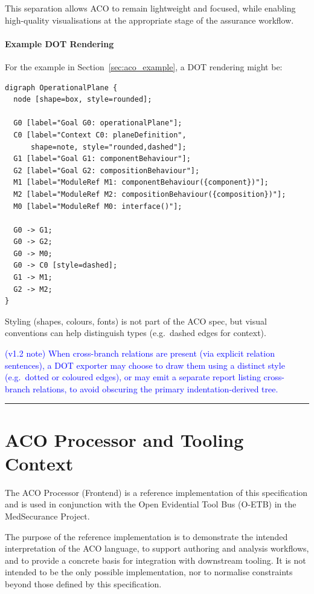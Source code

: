 \documentclass[11pt,twoside,a4paper]{article}
\begin{document}
This separation allows ACO to remain lightweight and focused, while enabling
high-quality visualisations at the appropriate stage of the assurance workflow.

\paragraph*{Example DOT Rendering}

For the example in Section~\ref{sec:aco_example}, a DOT rendering might be:

\begin{verbatim}
digraph OperationalPlane {
  node [shape=box, style=rounded];

  G0 [label="Goal G0: operationalPlane"];
  C0 [label="Context C0: planeDefinition",
      shape=note, style="rounded,dashed"];
  G1 [label="Goal G1: componentBehaviour"];
  G2 [label="Goal G2: compositionBehaviour"];
  M1 [label="ModuleRef M1: componentBehaviour({component})"];
  M2 [label="ModuleRef M2: compositionBehaviour({composition})"];
  M0 [label="ModuleRef M0: interface()"];

  G0 -> G1;
  G0 -> G2;
  G0 -> M0;
  G0 -> C0 [style=dashed];
  G1 -> M1;
  G2 -> M2;
}
\end{verbatim}

Styling (shapes, colours, fonts) is not part of the ACO spec, but visual conventions can help distinguish types (e.g.\ dashed edges for context).

\textcolor{blue}{(v1.2 note) When cross-branch relations are present (via explicit relation sentences), a DOT exporter may choose to draw them using a distinct style (e.g.\ dotted or coloured edges), or may emit a separate report listing cross-branch relations, to avoid obscuring the primary indentation-derived tree.}

\bigskip
\hrule
\bigskip



\section{ACO Processor and Tooling Context}
\label{sec:frontend}

The ACO Processor (Frontend) is a reference implementation of this specification and is used in
conjunction with the Open Evidential Tool Bus (O-ETB) in the MedSecurance Project.

The purpose of the reference implementation is to demonstrate the intended interpretation
of the ACO language, to support authoring and analysis workflows, and to provide a
concrete basis for integration with downstream tooling. It is not intended to be the
only possible implementation, nor to normalise constraints beyond those defined by this
specification.
\end{document}
